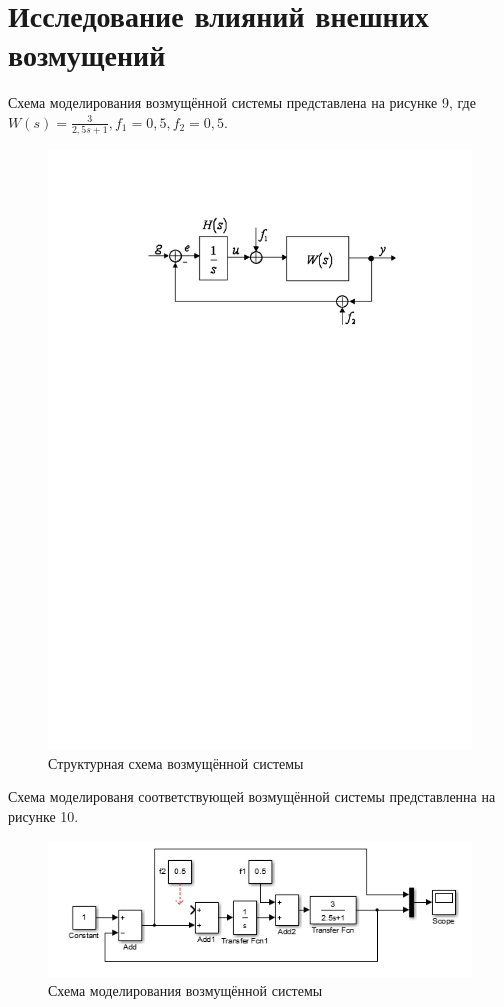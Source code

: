 \documentclass[a4paper, 11pt, russian]{article}
\begin{document}
    \section{Исследование влияний внешних возмущений}
    Схема моделирования возмущённой системы представлена на рисунке 9, где $W(s) = \displaystyle{\frac{3}{2,5s + 1}}, f_1 = 0,5, f_2 = 0,5.$\\
    \begin{figure}[ht!]
        \centering
        \includegraphics{disturbScheme}
        \caption{Структурная схема возмущённой системы}
    \end{figure}
    
    Схема моделированя соответствующей возмущённой системы представленна на рисунке 10.
    
    \begin{figure}[h!]
        \centering
        \includegraphics{dstScheme.PNG}
        \caption{Схема моделирования возмущённой системы}
    \end{figure}
    
\end{document}
